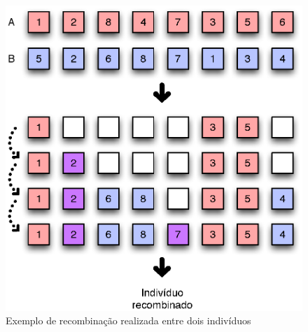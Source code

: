 \begin{figure}
  \centering
  \includegraphics[scale=0.70]{recomb-op}
  \caption{Exemplo de recombinação realizada entre dois
    indivíduos\label{fig:recomb-op}}
\end{figure}

